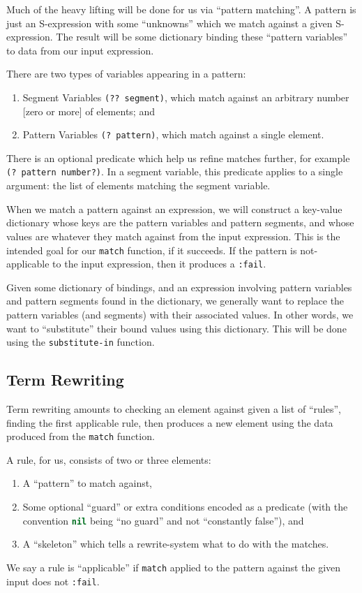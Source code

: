 \M
Much of the heavy lifting will be done for us via ``pattern matching''.
A pattern is just an S-expression with some ``unknowns'' which we match
against a given S-expression. The result will be some dictionary binding
these ``pattern variables'' to data from our input expression.

There are two types of variables appearing in a pattern:
\begin{enumerate}
\item Segment Variables \lstinline[language=lisp]{(?? segment)}, which
  match against an arbitrary number [zero or more] of elements; and
\item Pattern Variables \lstinline[language=lisp]{(? pattern)}, which match against a single element.
\end{enumerate}
There is an optional predicate which help us refine matches further, for
example
\lstinline[language=lisp]{(? pattern number?)}. In a segment variable,
this predicate applies to a single argument: the list of elements
matching the segment variable.

When we match a pattern against an expression, we will construct a
key-value dictionary whose keys are the pattern variables and pattern
segments, and whose values are whatever they match against from the
input expression. This is the intended goal for our
\lstinline[language=lisp]{match} function, if it succeeds. If the
pattern is not-applicable to the input expression, then it produces a
\lstinline[language=lisp]{:fail}.

Given some dictionary of bindings, and an expression involving pattern
variables and pattern segments found in the dictionary, we generally
want to replace the pattern variables (and segments) with their
associated values. In other words, we want to ``substitute'' their bound
values using this dictionary.
This will be done using the
\lstinline[language=lisp]{substitute-in} function.

\subsection{Term Rewriting}
Term rewriting amounts to checking an element against given a list of ``rules'',
finding the first applicable rule, then produces a new element using the
data produced from the \lstinline[language=lisp]{match} function.

A rule, for us, consists of two or three elements:
\begin{enumerate}
\item A ``pattern'' to match against,
\item Some optional ``guard'' or extra conditions encoded as a predicate
  (with the convention \lstinline[language=lisp]{nil} being ``no guard''
  and not ``constantly false''), and
\item A ``skeleton'' which tells a rewrite-system what to do with the matches.
\end{enumerate}
We say a rule is ``applicable'' if \lstinline[language=lisp]{match}
applied to the pattern against the given input does not
\lstinline[language=lisp]{:fail}.

